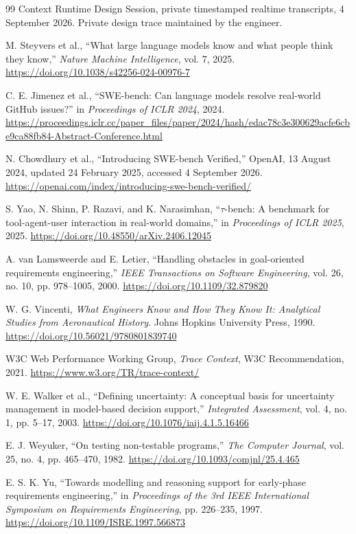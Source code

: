 \documentclass[10pt,a4paper]{article}
\begin{document}
\begin{thebibliography}{99}
Context Runtime Design Session, private timestamped realtime transcripts, 4 September 2026. Private design trace maintained by the engineer.

M. Steyvers et al., ``What large language models know and what people think they know,'' \emph{Nature Machine Intelligence}, vol. 7, 2025. \url{https://doi.org/10.1038/s42256-024-00976-7}

C. E. Jimenez et al., ``SWE-bench: Can language models resolve real-world GitHub issues?'' in \emph{Proceedings of ICLR 2024}, 2024. \url{https://proceedings.iclr.cc/paper_files/paper/2024/hash/edac78c3e300629acfe6cbe9ca88fb84-Abstract-Conference.html}

N. Chowdhury et al., ``Introducing SWE-bench Verified,'' OpenAI, 13 August 2024, updated 24 February 2025, accessed 4 September 2026. \url{https://openai.com/index/introducing-swe-bench-verified/}

S. Yao, N. Shinn, P. Razavi, and K. Narasimhan, ``$\tau$-bench: A benchmark for tool-agent-user interaction in real-world domains,'' in \emph{Proceedings of ICLR 2025}, 2025. \url{https://doi.org/10.48550/arXiv.2406.12045}

A. van Lamsweerde and E. Letier, ``Handling obstacles in goal-oriented requirements engineering,'' \emph{IEEE Transactions on Software Engineering}, vol. 26, no. 10, pp. 978--1005, 2000. \url{https://doi.org/10.1109/32.879820}

W. G. Vincenti, \emph{What Engineers Know and How They Know It: Analytical Studies from Aeronautical History}. Johns Hopkins University Press, 1990. \url{https://doi.org/10.56021/9780801839740}

W3C Web Performance Working Group, \emph{Trace Context}, W3C Recommendation, 2021. \url{https://www.w3.org/TR/trace-context/}

W. E. Walker et al., ``Defining uncertainty: A conceptual basis for uncertainty management in model-based decision support,'' \emph{Integrated Assessment}, vol. 4, no. 1, pp. 5--17, 2003. \url{https://doi.org/10.1076/iaij.4.1.5.16466}

E. J. Weyuker, ``On testing non-testable programs,'' \emph{The Computer Journal}, vol. 25, no. 4, pp. 465--470, 1982. \url{https://doi.org/10.1093/comjnl/25.4.465}

E. S. K. Yu, ``Towards modelling and reasoning support for early-phase requirements engineering,'' in \emph{Proceedings of the 3rd IEEE International Symposium on Requirements Engineering}, pp. 226--235, 1997. \url{https://doi.org/10.1109/ISRE.1997.566873}


\end{thebibliography}
\end{document}

